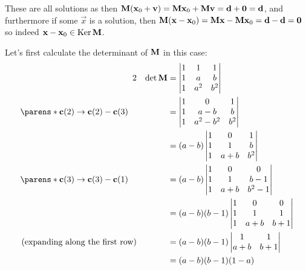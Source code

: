 \documentclass[fleqn,a4paper,11pt]{article}
\begin{document}
\begin{enumerate}[label=\textbf{\arabic*.}]
   These are all solutions as then
   \(\mathbf{M}(\mathrm{\mathbf{x}}_0 + \mathrm{\mathbf{v}})
     = \mathbf{M} \mathrm{\mathbf{x}}_0 + \mathbf{M} \mathrm{\mathbf{v}}
     = \mathrm{\mathbf{d}} + \mathrm{\mathbf{0}} = \mathrm{\mathbf{d}}\), and furthermore if some
   \(\vec x\) is a solution, then
   \(\mathbf{M}(\mathrm{\mathbf{x}} - \mathrm{\mathbf{x}}_0)
     = \mathbf{M} \mathrm{\mathbf{x}} - \mathbf{M} \mathrm{\mathbf{x}}_0
     = \mathrm{\mathbf{d}} - \mathrm{\mathbf{d}}
     = \mathrm{\mathbf{0}}\)
   so indeed \(\mathrm{\mathbf{x}} - \mathrm{\mathbf{x}}_0 \in \operatorname{Ker} \mathbf{M}\).

   Let's first calculate the determinant of \(\mathbf{M}\) in this case:
   \begin{alignat*}2
    &&\det \mat M &=
    \begin{vmatrix}
     1 & 1 & 1 \\
     1 & a & b \\
     1 & a^2 & b^2
    \end{vmatrix} \\
    \parens*{
     \vec c(2) \to \vec c(2) - \vec c(3)
    } \quad
    && &= \begin{vmatrix}
     1 & 0 & 1 \\
     1 & a - b & b \\
     1 & a^2 - b^2 & b^2
    \end{vmatrix} \\
    && &= (a - b)\begin{vmatrix}
     1 & 0 & 1 \\
     1 & 1 & b \\
     1 & a + b & b^2
    \end{vmatrix} \\
    \parens*{
     \vec c(3) \to \vec c(3) - \vec c(1)
    } \quad
    && &= (a - b)\begin{vmatrix}
     1 & 0 & 0 \\
     1 & 1 & b - 1 \\
     1 & a + b & b^2 - 1
    \end{vmatrix} \\
    && &= (a - b)(b - 1)\begin{vmatrix}
     1 & 0 & 0 \\
     1 & 1 & 1 \\
     1 & a + b & b + 1
    \end{vmatrix} \\
    (\text{expanding along the first row})
    && &= (a - b)(b - 1)\begin{vmatrix}
     1 & 1 \\
     a + b & b + 1
    \end{vmatrix} \\
    && &= (a - b)(b - 1)(1 - a)
   \end{alignat*}

\end{enumerate}
\end{document}

